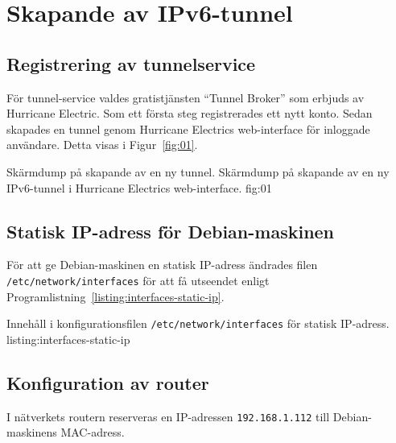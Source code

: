 %
%
%


\section{Skapande av IPv6-tunnel}
\subsection{Registrering av tunnelservice}
För tunnel-service valdes gratistjänsten ``Tunnel Broker''
\cite{ipv6:tunnelbroker} som erbjuds av Hurricane Electric.  
Som ett första steg registrerades ett nytt konto. Sedan skapades en tunnel
genom Hurricane Electrics web-interface för inloggade användare. 
Detta visas i Figur~\ref{fig:01}.

           {Skärmdump på skapande av en ny tunnel.}
           {Skärmdump på skapande av en ny IPv6-tunnel i Hurricane Electrics
            web-interface.}
           {fig:01}


\subsection{Statisk IP-adress för Debian-maskinen}
För att ge Debian-maskinen en statisk IP-adress ändrades filen
\texttt{/etc/network/interfaces} för att få utseendet enligt
Programlistning~\ref{listing:interfaces-static-ip}.

            {Innehåll i konfigurationsfilen \texttt{/etc/network/interfaces}
 					   för statisk IP-adress.}
            {listing:interfaces-static-ip}


\subsection{Konfiguration av router}
I nätverkets routern reserveras en IP-adressen \texttt{192.168.1.112} till
Debian-maskinens MAC-adress.


